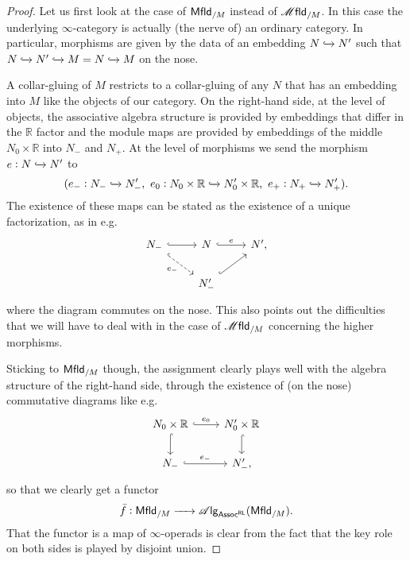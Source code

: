 \documentclass[../text]{subfiles}
\begin{document}
\begin{proof}
    Let us first look at the case of $\mfld[r]_{/M}$ instead of $\mfld_{/M}$. In this case the underlying $\infty$-category is actually (the nerve of) an ordinary category. In particular, morphisms are given by the data of an embedding $N \xhookrightarrow{} N'$ such that $N \xhookrightarrow{} N' \xhookrightarrow{} M = N \xhookrightarrow{} M$ on the nose.
    
    A collar-gluing of $M$ restricts to a collar-gluing of any $N$ that has an embedding into $M$ like the objects of our category. On the right-hand side, at the level of objects, the associative algebra structure is provided by embeddings that differ in the $\mathbb{R}$ factor and the module maps are provided by embeddings of the middle $N_0 \times \mathbb{R}$ into $N_-$ and $N_+$. At the level of morphisms we send the morphism $e: N \xhookrightarrow{} N'$ to
    \begin{equation}
        (e_-: N_- \xhookrightarrow{} N'_-, \ e_0: N_0 \times \mathbb{R} \xhookrightarrow{} N'_0 \times \mathbb{R}, \ e_+: N_+ \xhookrightarrow{} N'_+).
    \end{equation}
    The existence of these maps can be stated as the existence of a unique factorization, as in e.g.
    \begin{equation}
        \begin{tikzcd}
            N_- \arrow[r, hook] \arrow[rd, dashed, hook, "e_-"'] & N \arrow[r, hook, "e"] & N', \\
            & N'_- \arrow[ru, hook] &
            \end{tikzcd}
    \end{equation}
    where the diagram commutes on the nose. This also points out the difficulties that we will have to deal with in the case of $\mfld_{/M}$ concerning the higher morphisms.

    Sticking to $\mfld[r]_{/M}$ though, the assignment clearly plays well with the algebra structure of the right-hand side, through the existence of (on the nose) commutative diagrams like e.g.
    \begin{equation}
        \begin{tikzcd}
            N_0 \times \mathbb{R} \arrow[r, hook, "e_0"] \arrow[d, hook] & N'_0 \times \mathbb{R} \arrow[d, hook]\\
            N_- \arrow[r, hook, "e_-"] & N'_-,
            \end{tikzcd}
    \end{equation}
    so that we clearly get a functor
    \begin{equation}
        \bar{f}: \mfld[r]_{/M} \xrightarrow{\ \ \ \ } \alg{\mathsf{Assoc^{RL}}} (\mfld[r]_{/M}).
    \end{equation}
    That the functor is a map of $\infty$-operads is clear from the fact that the key role on both sides is played by disjoint union. 


\end{proof}
\end{document}
